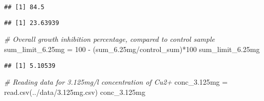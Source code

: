 \documentclass[
]{article}
\newenvironment{Shaded}{\begin{snugshade}}{\end{snugshade}}
\newcommand{\CommentTok}[1]{\textcolor[rgb]{0.56,0.35,0.01}{\textit{#1}}}
\newcommand{\DecValTok}[1]{\textcolor[rgb]{0.00,0.00,0.81}{#1}}
\newcommand{\FloatTok}[1]{\textcolor[rgb]{0.00,0.00,0.81}{#1}}
\newcommand{\FunctionTok}[1]{\textcolor[rgb]{0.00,0.00,0.00}{#1}}
\newcommand{\NormalTok}[1]{#1}
\newcommand{\OtherTok}[1]{\textcolor[rgb]{0.56,0.35,0.01}{#1}}
\newcommand{\SpecialCharTok}[1]{\textcolor[rgb]{0.00,0.00,0.00}{#1}}
\newcommand{\StringTok}[1]{\textcolor[rgb]{0.31,0.60,0.02}{#1}}
\begin{document}
\begin{verbatim}
## [1] 84.5
\end{verbatim}

\begin{Shaded}
\end{Shaded}

\begin{verbatim}
## [1] 23.63939
\end{verbatim}

\begin{Shaded}
\begin{Highlighting}[]
\CommentTok{\# Overall growth inhibition percentage, compared to control sample}
\NormalTok{sum\_limit\_6}\FloatTok{.25}\NormalTok{mg }\OtherTok{=} \DecValTok{100} \SpecialCharTok{{-}}\NormalTok{ (sum\_6}\FloatTok{.25}\NormalTok{mg}\SpecialCharTok{/}\NormalTok{control\_sum)}\SpecialCharTok{*}\DecValTok{100}
\NormalTok{sum\_limit\_6}\FloatTok{.25}\NormalTok{mg}
\end{Highlighting}
\end{Shaded}

\begin{verbatim}
## [1] 5.10539
\end{verbatim}

\begin{Shaded}
\begin{Highlighting}[]
\CommentTok{\# Reading data for 3.125mg/l concentration of Cu2+}
\NormalTok{conc\_3}\FloatTok{.125}\NormalTok{mg }\OtherTok{=} \FunctionTok{read.csv}\NormalTok{(}\StringTok{\textquotesingle{}../data/3.125mg.csv\textquotesingle{}}\NormalTok{)}
\NormalTok{conc\_3}\FloatTok{.125}\NormalTok{mg}
\end{Highlighting}
\end{Shaded}
\end{document}
